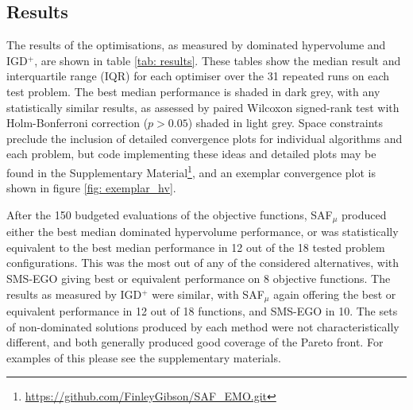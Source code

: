 \documentclass[conference]{IEEEtran}
\newcommand\hpv{dominated hypervolume\xspace}
\newcommand\safmu{SAF$_{\mu}$\xspace}
\newcommand\smsego{SMS-EGO\xspace}
\newcommand\igd{IGD$^+$\xspace}
\begin{document}

\subsection{Results}


The results of the optimisations, as measured by \hpv and \igd, are shown in table \ref{tab: results}. These tables show the median result and interquartile range (IQR) for each optimiser over the 31 repeated runs on each test problem. The best median performance is shaded in dark grey, with any statistically similar results, as assessed by paired Wilcoxon signed-rank test
with Holm-Bonferroni correction 
($p>0.05$) shaded in light grey.  Space constraints preclude the inclusion of detailed convergence plots for individual algorithms and each problem, but code implementing these ideas and detailed plots may be found in the Supplementary Material\footnote{\url{https://github.com/FinleyGibson/SAF_EMO.git}}, and an exemplar convergence plot is shown in figure \ref{fig: exemplar_hv}.

After the  150 budgeted evaluations of the objective functions, \safmu produced either the best median \hpv performance, or was statistically equivalent to the best median performance in 12 out of the 18 tested problem configurations. This was the most out of any of the considered alternatives, with \smsego giving best or equivalent performance on 8 objective functions. The results as measured by \igd were similar, with \safmu again offering the best or equivalent performance in 12 out of 18 functions, and \smsego in 10. The sets of non-dominated solutions produced by each method were not characteristically different, and both generally produced good coverage of the Pareto front. For examples of this please see the supplementary materials.
\end{document}
